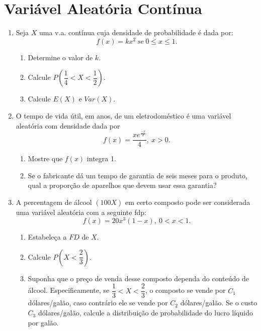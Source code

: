 \thispagestyle{cap3}
\section*{Variável Aleatória Contínua}
\begin{enumerate}
\item Seja $X$ uma v.a. contínua cuja densidade de probabilidade é dada por:
	\begin{equation*}
		f(x)=kx^{2}\ se\ 0\leq x \leq 1.
	\end{equation*}
	
	\begin{enumerate}[label=\alph*)]
		\item Determine o valor de $k$.
		\item Calcule $P(\dfrac{1}{4}< X < \dfrac{1}{2})$.
		\item Calcule $E(X)$ e $Var(X)$.
	\end{enumerate}
	
\item O tempo de vida útil, em anos, de um eletrodoméstico é uma variável aleatória com densidade dada por
	\begin{equation*}
		f(x)=\dfrac{xe^{\frac{-x}{2}}}{4},\ x>0.
	\end{equation*}
	
	\begin{enumerate}[label=\alph*)]
		\item Mostre que $f(x)$ integra 1.
		\item Se o fabricante dá um tempo de garantia de seis meses para o produto, qual a proporção de aparelhos que devem usar essa garantia?
	\end{enumerate}
\setcounter{enumi}{3}
\item A percentagem de álcool $(100X)$ em certo composto pode ser considerada uma variável aleatória com a seguinte fdp:
	\begin{equation*}
		f(x) = 20x^{3}(1-x),\ 0 < x < 1.
	\end{equation*}

	\begin{enumerate}[label=\alph*)]
		\item Estabeleça a $FD$ de $X$.
		\item Calcule $P(X < \dfrac{2}{3})$.
		\item Suponha que o preço de venda desse composto dependa do conteúdo de álcool. Especificamente, se $\dfrac{1}{3} < X < \dfrac{2}{3}$, o composto se vende por $C_{1}$ dólares/galão, caso contrário ele se vende por $C_{2}$ dólares/galão. Se o custo $C_{3}$ dólares/galão, calcule a distribuição de probabilidade do lucro líquido por galão.
	\end{enumerate}
\end{enumerate}